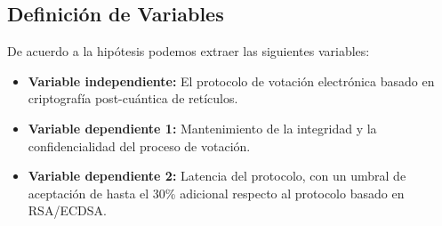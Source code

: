 \subsection{Definición de Variables}
De acuerdo a la hipótesis podemos extraer las siguientes variables:

\begin{itemize}
	\item \textbf{Variable independiente:} El protocolo de votación electrónica basado en criptografía post-cuántica de retículos.
	\item \textbf{Variable dependiente 1:} Mantenimiento de la integridad y la confidencialidad del proceso de votación.
	\item \textbf{Variable dependiente 2:} Latencia del protocolo, con un umbral de aceptación de hasta el 30\% adicional respecto al protocolo basado en RSA/ECDSA.
\end{itemize}

